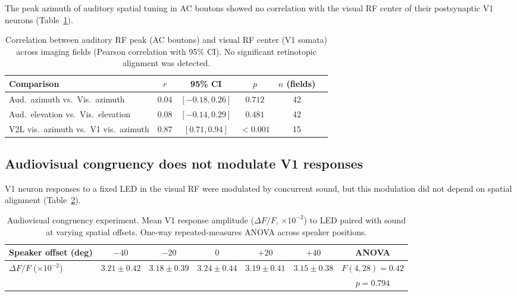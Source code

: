 \documentclass[11pt]{article}
\begin{document}
The peak azimuth of auditory spatial tuning in AC boutons showed no correlation with the visual RF center of their postsynaptic V1 neurons (Table~\ref{tab:retinotopy}).

\begin{table}[H]
\centering
\caption{Correlation between auditory RF peak (AC boutons) and visual RF center (V1 somata) across imaging fields (Pearson correlation with 95\% CI). No significant retinotopic alignment was detected.}
\label{tab:retinotopy}
\begin{tabular}{lccccc}
\toprule
\textbf{Comparison} & \textbf{$r$} & \textbf{95\% CI} & \textbf{$p$} & \textbf{$n$ (fields)} \\
\midrule
Aud.\ azimuth vs.\ Vis.\ azimuth & $0.04$ & $[-0.18, 0.26]$ & $0.712$ & 42 \\
Aud.\ elevation vs.\ Vis.\ elevation & $0.08$ & $[-0.14, 0.29]$ & $0.481$ & 42 \\
V2L vis.\ azimuth vs.\ V1 vis.\ azimuth & $0.87$ & $[0.71, 0.94]$ & $< 0.001$ & 15 \\
\bottomrule
\end{tabular}
\end{table}

\subsection{Audiovisual congruency does not modulate V1 responses}

V1 neuron responses to a fixed LED in the visual RF were modulated by concurrent sound, but this modulation did not depend on spatial alignment (Table~\ref{tab:congruency}).

\begin{table}[H]
\centering
\caption{Audiovisual congruency experiment. Mean V1 response amplitude ($\Delta F/F$, $\times 10^{-2}$) to LED paired with sound at varying spatial offsets. One-way repeated-measures ANOVA across speaker positions.}
\label{tab:congruency}
\begin{tabular}{lcccccc}
\toprule
\textbf{Speaker offset (deg)} & $-40$ & $-20$ & $0$ & $+20$ & $+40$ & \textbf{ANOVA} \\
\midrule
$\Delta F/F$ ($\times 10^{-2}$) & $3.21 \pm 0.42$ & $3.18 \pm 0.39$ & $3.24 \pm 0.44$ & $3.19 \pm 0.41$ & $3.15 \pm 0.38$ & $F(4,28)=0.42$ \\
& & & & & & $p = 0.794$ \\
\bottomrule
\end{tabular}
\end{table}
\end{document}

